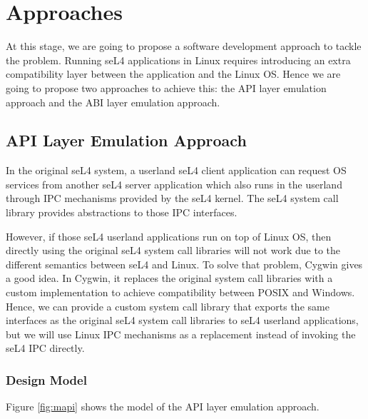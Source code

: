 \chapter{Approaches}\label{ch:approaches}

At this stage, we are going to propose a software development approach to tackle the problem. Running seL4 applications in Linux requires introducing an extra compatibility layer between the application and the Linux OS. Hence we are going to propose two approaches to achieve this: the API layer emulation approach and the ABI layer emulation approach.  

\section{API Layer Emulation Approach}

In the original seL4 system, a userland seL4 client application can request OS services from another seL4 server application which also runs in the userland through IPC mechanisms provided by the seL4 kernel. The seL4 system call library provides abstractions to those IPC interfaces.


However, if those seL4 userland applications run on top of Linux OS, then directly using the original seL4 system call libraries will not work due to the different semantics between seL4 and Linux. To solve that problem, Cygwin gives a good idea. In Cygwin, it replaces the original system call libraries with a custom implementation to achieve compatibility between POSIX and Windows. Hence, we can provide a custom system call library that exports the same interfaces as the original seL4 system call libraries to seL4 userland applications, but we will use Linux IPC mechanisms as a replacement instead of invoking the seL4 IPC directly.

\subsection{ Design Model}

Figure \ref{fig:mapi} shows the model of the API layer emulation approach. 

